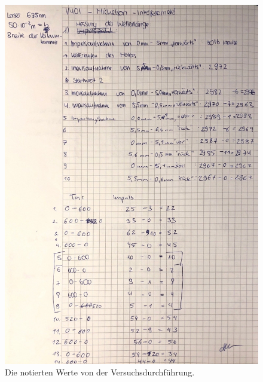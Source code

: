 \begin{figure}
    \centering
    \includegraphics[width=\textwidth]{content/data_v401.pdf}
    \caption{Die notierten Werte von der Versuchsdurchführung.}
    \label{fig:datenmessung}
\end{figure}
